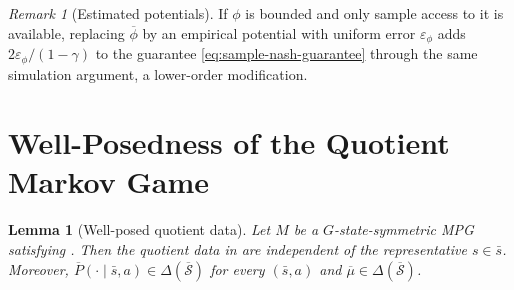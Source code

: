 \documentclass{article}
\theoremstyle{plain}
\newtheorem{lemma}[theorem]{Lemma}
\theoremstyle{definition}
\theoremstyle{remark}
\newtheorem{remark}[theorem]{Remark}
\newcommand{\St}{\mathcal{S}}
\newcommand{\quotient}[1]{\overline{#1}}
\begin{document}
\begin{remark}[Estimated potentials]
\label{rem:unknown-potential}
If $\phi$ is bounded and only sample access to it is available, replacing
$\quotient\phi$ by an empirical potential with uniform error
$\varepsilon_\phi$ adds $2\varepsilon_\phi/(1-\gamma)$ to the guarantee
\eqref{eq:sample-nash-guarantee} through the same simulation argument, a
lower-order modification.
\end{remark}

\clearpage
\appendix

\section{Well-Posedness of the Quotient Markov Game}
\label{app:proof-quotient-well-posed}

\begin{lemma}[Well-posed quotient data]
\label{lemma:quotient-well-posed}
Let $M$ be a $G$-state-symmetric MPG satisfying .
Then the quotient data in  are independent of the
representative $s\in\bar s$. Moreover,
$\quotient P(\cdot\mid\bar s,a)\in\Delta(\quotient\St)$ for every
$(\bar s,a)$ and $\quotient\mu\in\Delta(\quotient\St)$.
\end{lemma}
\end{document}
